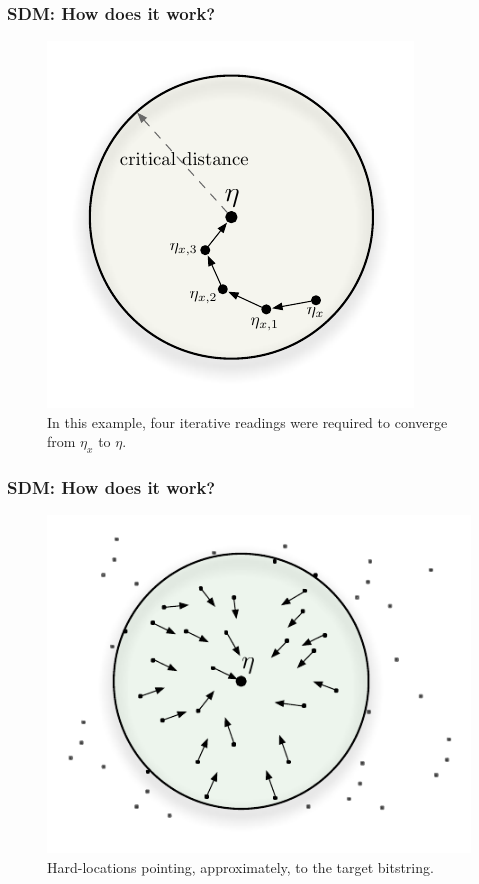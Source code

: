 \documentclass{beamer}
\begin{document}
\begin{frame}
\frametitle{SDM: How does it work?}
\begin{figure}
\centering\includegraphics[scale=0.75]{./images02/p1_p2_iter_read.pdf}
\caption{In this example, four iterative readings were required to converge from $\eta_{x}$ to $\eta$.}
\end{figure}
\end{frame}


\begin{frame}
\frametitle{SDM: How does it work?}
\begin{figure}
\centering\includegraphics[scale=0.75]{./images02/p1_after_write.pdf}
\caption{Hard-locations pointing, approximately, to the target bitstring.}
\end{figure}
\end{frame}
\end{document}
